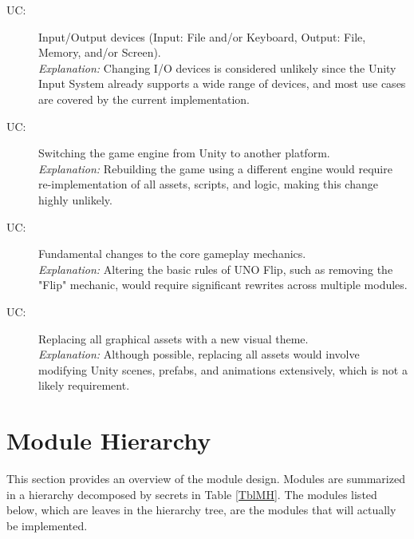 \documentclass[12pt, titlepage]{article}
\newcounter{ucnum}
\newcommand{\uctheucnum}{UC\theucnum}
\begin{document}
\begin{description}
\item[ \uctheucnum \label{ucIO}:] Input/Output devices
  (Input: File and/or Keyboard, Output: File, Memory, and/or Screen). \\
  \textit{Explanation:} Changing I/O devices is considered unlikely since the Unity Input System already supports a wide range of devices, and most use cases are covered by the current implementation.

\item[ \uctheucnum \label{ucEngine}:] Switching the game engine from Unity to another platform. \\
  \textit{Explanation:} Rebuilding the game using a different engine would require re-implementation of all assets, scripts, and logic, making this change highly unlikely.

\item[ \uctheucnum \label{ucMechanics}:] Fundamental changes to the core gameplay mechanics. \\
  \textit{Explanation:} Altering the basic rules of UNO Flip, such as removing the "Flip" mechanic, would require significant rewrites across multiple modules.

\item[ \uctheucnum \label{ucAssets}:] Replacing all graphical assets with a new visual theme. \\
  \textit{Explanation:} Although possible, replacing all assets would involve modifying Unity scenes, prefabs, and animations extensively, which is not a likely requirement.
\end{description}

\section{Module Hierarchy} \label{SecMH}

This section provides an overview of the module design. Modules are summarized
in a hierarchy decomposed by secrets in Table \ref{TblMH}. The modules listed
below, which are leaves in the hierarchy tree, are the modules that will
actually be implemented.
\end{document}
